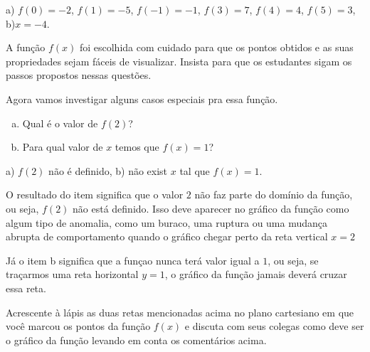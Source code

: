 \documentclass[main.tex]{subfiles}
\begin{document}
\begin{gabarito}
	\begin{gabaritoQuestao}
		a) $f(0)=-2$, $f(1)=-5$, $f(-1)=-1$, $f(3)=7$, $f(4)=4$, $f(5)=3$, b)$x=-4$.
	\end{gabaritoQuestao}
\end{gabarito}

\paraTutores

A função $f(x)$ foi escolhida com cuidado para que os pontos obtidos e as suas propriedades sejam fáceis de visualizar. Insista para que os estudantes sigam os passos propostos nessas questões.

\paraAmbos

\begin{questao}
Agora vamos investigar alguns casos especiais pra essa função.
\begin{enumerate}[a)]
\item Qual é o valor de $f(2)$?
\item Para qual valor de $x$ temos que $f(x)=1$?
\end{enumerate}
\end{questao}

\begin{gabarito}
	\begin{gabaritoQuestao}
		a) $f(2)$ não é definido, b) não exist $x$ tal que $f(x)=1$.
	\end{gabaritoQuestao}
\end{gabarito}

O resultado do item significa que o valor $2$ não faz parte do domínio da função, ou seja, $f(2)$ não está definido. Isso deve aparecer no gráfico da função como algum tipo de anomalia, como um buraco, uma ruptura ou uma mudança abrupta de comportamento quando o gráfico chegar perto da reta vertical $x=2$

Já o item b significa que a funçao nunca terá valor igual a $1$, ou seja, se traçarmos uma reta horizontal $y=1$, o gráfico da função jamais deverá cruzar essa reta.

\begin{questao}
Acrescente à lápis as duas retas mencionadas acima no plano cartesiano em que você marcou os pontos da função $f(x)$ e discuta com seus colegas como deve ser o gráfico da função levando em conta os comentários acima.
\end{questao}
\end{document}
